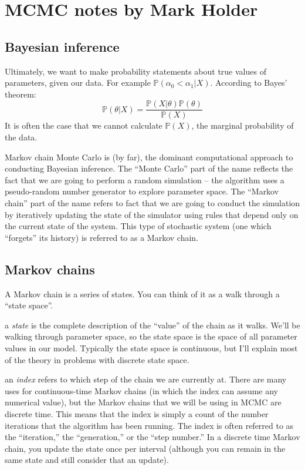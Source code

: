 \documentclass[11pt]{article}
\renewcommand{\Pr}{{\mathbb P}}
\begin{document}

\section*{MCMC notes by Mark Holder}
\subsection*{Bayesian inference}
Ultimately, we want to make probability statements about true values of parameters, given our data. For example $\Pr(\alpha_0 < \alpha_1|X)$.
According to Bayes' theorem:
	$$\Pr(\theta|X) = \frac{\Pr(X|\theta)\Pr(\theta)}{\Pr(X)}$$
It is often the case that we cannot calculate $\Pr(X)$, the marginal probability of the data.


Markov chain Monte Carlo is (by far), the dominant computational approach to conducting Bayesian inference.
The ``Monte Carlo'' part of the name reflects the fact that we are going to perform a random simulation -- the algorithm uses a pseudo-random number generator to explore parameter space.
The ``Markov chain'' part of the name refers to fact that we are going to conduct the simulation by iteratively updating the state of the simulator using rules that depend only on the current state of the system.
This type of stochastic system (one which ``forgets'' its history) is referred to as a Markov chain.

\subsection*{Markov chains}
A Markov chain is a series of states.
You can think of it as a walk through a ``state space''.
\begin{compactitem}
	\item a {\em state} is the complete description of the ``value'' of the chain as it walks.  We'll be walking through parameter space, so the state space is the space of all parameter values in our model.
	Typically the state space is continuous, but I'll explain most of the theory in problems with discrete state space.
	\item an {\em index} refers to which step of the chain we are currently at. There are many uses for continuous-time Markov chains (in which the index can assume any numerical value), but the Markov chains that we will be using in MCMC are discrete time.  This means that the index is simply a count of the number iterations that the algorithm has been running.  The index is often referred to as the ``iteration,'' the ``generation,'' or the ``step number.''  In a discrete time Markov chain, you update the state once per interval (although you can remain in the same state and still consider that an update).
\end{compactitem}
\end{document}
